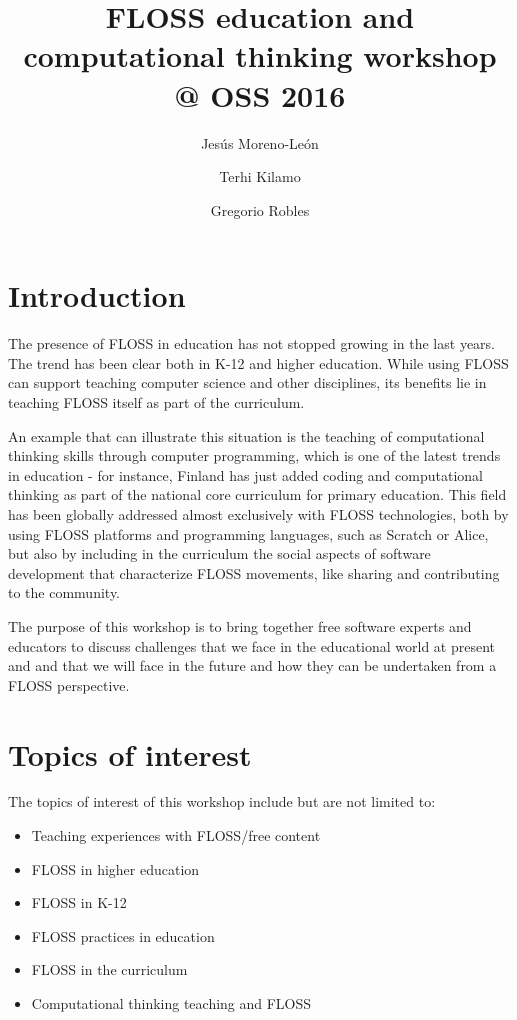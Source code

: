 \documentclass[ifip]{svmult}
\begin{document}
\title*{FLOSS education and computational thinking workshop @ OSS 2016}
\author{Jesús Moreno-León\and
Terhi Kilamo
\and
Gregorio Robles}
%
%
\maketitle

\section*{Introduction}
The presence of FLOSS in education has not stopped growing in the last years. The trend has been clear both in K-12 and higher education. While using FLOSS can support teaching computer science and other disciplines, its benefits lie in teaching FLOSS itself as part of the curriculum. 

An example that can illustrate this situation is the teaching of computational thinking skills through computer programming, which is one of the latest trends in education - for instance, Finland has just added coding and computational thinking as part of the national core curriculum for primary education. This field has been globally addressed almost exclusively with FLOSS technologies, both by using FLOSS platforms and programming languages, such as Scratch or Alice, but also by including in the curriculum the social aspects of software development that characterize FLOSS movements, like sharing and contributing to the community. 

The purpose of this workshop is to bring together free software experts and educators to discuss challenges that we face in the educational world at present and and that we will face in the future and how they can be undertaken from a FLOSS perspective.

\section*{Topics of interest}
The topics of interest of this workshop include but are not limited to:
\begin{itemize}
 \item Teaching experiences with FLOSS/free content
 \item FLOSS in higher education 
 \item FLOSS in K-12
 \item FLOSS practices in education 
 \item FLOSS in the curriculum 
 \item Computational thinking teaching and FLOSS
\end{itemize}
\end{document}
